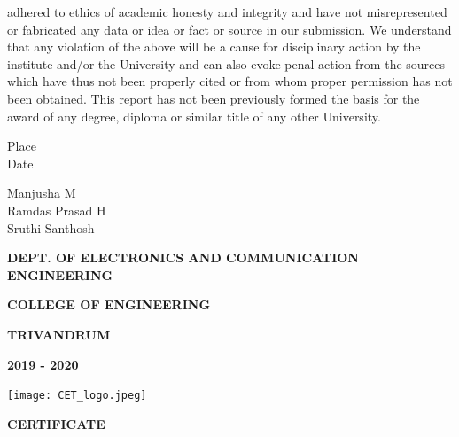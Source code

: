 \documentclass[12pt,a4paper]{report}
\begin{document}
adhered to ethics of academic honesty and integrity and have not misrepresented or fabricated any data or idea or fact or source in our submission. We understand that any violation of the above will be a cause for disciplinary action by the institute and/or the
University and can also evoke penal action from the sources which have thus not been properly cited or from whom proper permission has not been obtained. This report has not been previously formed the basis for the award of any degree, diploma or similar title of any other University.\\
\noindent 
\begin{minipage}{0.45\linewidth}
\begin{flushleft}
\vspace{1 cm}
                         
Place \\
Date\\

\end{flushleft} 
\end{minipage}
\hfill
\begin{minipage}{0.45\linewidth}
\begin{flushright}                                      
\vspace{2cm}
Manjusha M\\
\vspace{2cm}                         
Ramdas Prasad H\\
\vspace{2cm}
Sruthi Santhosh\\


\end{flushright} 
\end{minipage}

\thispagestyle{empty}
\newpage
\begin{center}


\textbf{DEPT. OF ELECTRONICS AND COMMUNICATION ENGINEERING}

\textbf{COLLEGE OF ENGINEERING}

\textbf{TRIVANDRUM}

\textbf{2019 - 2020}
\end{center}
\begin{center}
\texttt{[image: CET\_logo.jpeg]}

\end{center}
\begin{center}
 \textbf{\large{CERTIFICATE}}
\end{center}
 
\end{document}
